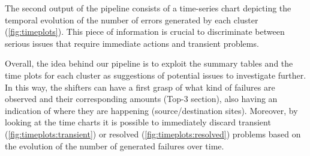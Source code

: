 

The second output of the pipeline consists of a time-series chart depicting the temporal evolution of the number of errors generated by each cluster
(\cref{fig:timeplots}).
This piece of information is crucial to discriminate between serious issues that require immediate actions and transient problems. 

Overall, the idea behind our pipeline is to exploit the summary tables and the time plots for each cluster as suggestions of potential issues to investigate further.
In this way, the shifters can have a first grasp of what kind of failures are observed and their corresponding amounts (Top-3 section), also having an indication of where they are happening (source/destination sites).
Moreover, by looking at the time charts it is possible to immediately discard transient (\cref{fig:timeplots:transient}) or resolved (\cref{fig:timeplots:resolved}) problems based on the evolution of the number of generated failures over time.



